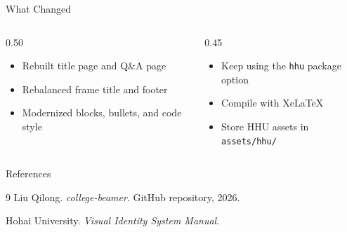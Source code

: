 \documentclass{beamer}
\begin{document}
\begin{frame}{What Changed}
    \begin{columns}[T]
        \begin{column}{0.50\textwidth}
            \begin{itemize}
                \item Rebuilt title page and Q\&A page
                \item Rebalanced frame title and footer
                \item Modernized blocks, bullets, and code style
            \end{itemize}
        \end{column}
        \begin{column}{0.45\textwidth}
            \begin{itemize}
                \item Keep using the \texttt{hhu} package option
                \item Compile with XeLaTeX
                \item Store HHU assets in \texttt{assets/hhu/}
            \end{itemize}
        \end{column}
    \end{columns}
\end{frame}

\begin{frame}{References}
    \small
    \begin{thebibliography}{9}
        Liu Qilong.
        \newblock \emph{college-beamer}.
        \newblock GitHub repository, 2026.

        Hohai University.
        \newblock \emph{Visual Identity System Manual}.
    \end{thebibliography}
\end{frame}

\QApage
\end{document}
